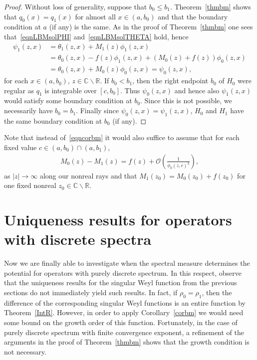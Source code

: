 \documentclass{amsart}
\numberwithin{equation}{section}
\begin{document}
\begin{proof}
Without loss of generality, suppose that $b_0\leq b_1$.
Theorem~\ref{thmbm} shows that $q_0(x)=q_1(x)$ for almost all  $x\in(a,b_0)$ and that the boundary condition at $a$ (if any) is the same.
As in the proof of Theorem~\ref{thmbm} one sees that~\eqref{eqnLBMsolPHI} and~\eqref{eqnLBMsolTHETA} hold, hence
\begin{align*}
  \psi_1(z,x) & = \theta_1(z,x) + M_1(z)\phi_1(z,x) \\
              & = \theta_0(z,x) - f(z)\phi_1(z,x) + (M_0(z)+f(z))\phi_0(z,x) \\
              & = \theta_0(z,x) + M_0(z)\phi_0(z,x) = \psi_0(z,x), 
\end{align*}
for each $x\in(a,b_0)$, $z\in{{\mathbb C}}\backslash{{\mathbb R}}$.
If $b_0<b_1$, then the right endpoint $b_0$ of $H_0$ were regular as $q_1$ is integrable over $[c,b_0]$.
Thus $\psi_0(z,x)$ and hence also $\psi_1(z,x)$ would satisfy some boundary condition at $b_0$.
Since this is not possible, we necessarily have $b_0=b_1$. 
Finally since $\psi_0(z,x)=\psi_1(z,x)$, $H_0$ and $H_1$ have the same boundary condition at $b_0$ (if any).
\end{proof}

Note that instead of~\eqref{eqncorbm} it would also suffice to assume that for each fixed value $c\in(a,b_0)\cap(a,b_1)$,
\begin{align*}
 M_0(z) - M_1(z) = f(z) + {\mathcal{O}}\left(\frac{1}{\phi_0(z,c)^2}\right),
\end{align*}
as $|z|\rightarrow\infty$ along our nonreal rays and that $M_1(z_0)= M_0(z_0)+f(z_0)$ for one fixed nonreal $z_0\in{{\mathbb C}}\backslash{{\mathbb R}}$.

\section{Uniqueness results for operators with discrete spectra}
\label{sec:urds}

Now we are finally able to investigate when the spectral measure determines the potential for operators with purely discrete spectrum.
In this respect, observe that the uniqueness results for the singular Weyl function from the previous sections do not  immediately yield
such results. In fact, if $\rho_0=\rho_1$, then the difference of the corresponding singular Weyl functions is an entire function by Theorem~\ref{IntR}.
However, in order to apply Corollary~\ref{corbm} we would need some bound on the growth order of this function. 
Fortunately, in the case of purely discrete spectrum with finite convergence exponent, a refinement of the arguments in the proof
of Theorem~\ref{thmbm} shows that the growth condition is not necessary.
\end{document}
